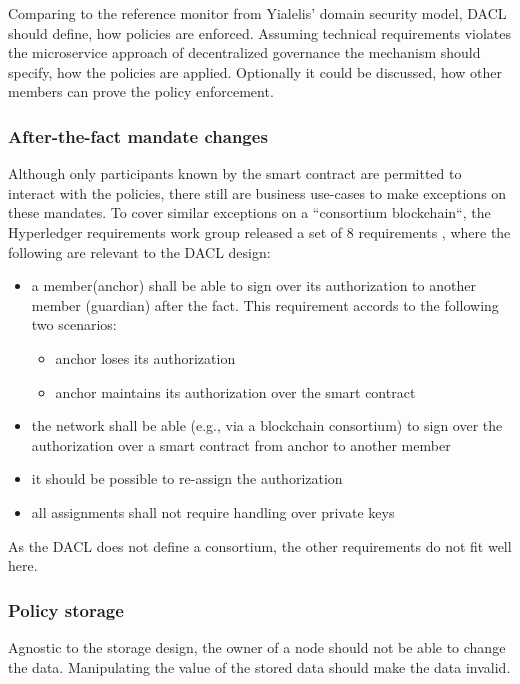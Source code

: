 \documentclass[12pt, conference]{IEEEtran}
\begin{document}
Comparing to the reference monitor from Yialelis' domain security model, DACL should define, how policies are enforced. Assuming technical requirements violates the microservice approach of decentralized governance the mechanism should specify, how the policies are applied. Optionally it could be discussed, how other members can prove the policy enforcement.

\subsubsection{After-the-fact mandate changes}

Although only participants known by the smart contract are permitted to interact with the policies, there still are business use-cases to make exceptions on these mandates. To cover similar exceptions on a ``consortium blockchain``, the Hyperledger requirements work group released a set of 8 requirements \cite{a1}, where the following are relevant to the DACL design:

\begin{itemize}
\item{a member(anchor) shall be able to sign over its authorization to another member (guardian) after the fact. This requirement accords to the following two scenarios:
    \begin{itemize}    
    \item     {anchor loses its authorization}
    \item {anchor maintains its authorization over the smart contract}
    \end{itemize}
}
\item the network shall be able (e.g., via a blockchain consortium) to sign over the authorization over a smart contract from anchor to another member
\item it should be possible to re-assign the authorization
\item all assignments shall not require handling over private keys
\end{itemize}

As the DACL does not define a consortium, the other requirements do not fit well here.

\subsubsection{Policy storage}

Agnostic to the storage design, the owner of a node should not be able to change the data. Manipulating the value of the stored data should make the data invalid.
\end{document}

